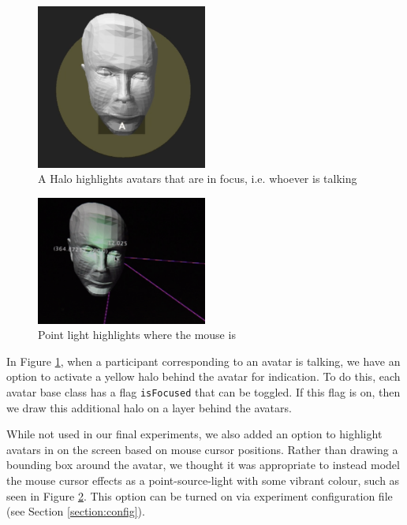 \begin{figure}
	\centering
	\includegraphics[width=0.5\textwidth]{halo.png}
	\caption{A Halo highlights avatars that are in focus, i.e. whoever is talking}
	\label{fig:halo}
\end{figure}

\begin{figure}
	\centering
	\includegraphics[width=0.5\textwidth]{pointlight.png}
	\caption{Point light highlights where the mouse is}
	\label{fig:pointlight}
\end{figure}

In Figure \ref{fig:halo}, when a participant corresponding to an avatar is talking, we have an option to activate a yellow halo behind the avatar for indication. To do this, each avatar base class has a flag \texttt{isFocused} that can be toggled. If this flag is on, then we draw this additional halo on a layer behind the avatars.

While not used in our final experiments, we also added an option to highlight avatars in on the screen based on mouse cursor positions. Rather than drawing a bounding box around the avatar, we thought it was appropriate to instead model the mouse cursor effects as a point-source-light with some vibrant colour, such as seen in Figure \ref{fig:pointlight}. This option can be turned on via experiment configuration file (see Section \ref{section:config}). 

